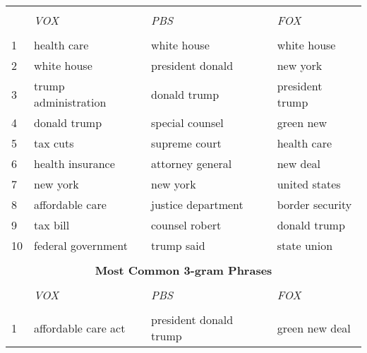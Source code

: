 \begin{table}[H]
\begin{tabular}{l||l|l|l}
        &                             &                            &                             \\
        & \textit{VOX}                & \textit{PBS}               & \textit{FOX}                \\ \hline 
        &                             &                            &                             \\
    1   & health care                 & white house                & white house                 \\
    2   & white house                 & president donald           & new york                    \\
    3   & trump administration        & donald trump               & president trump             \\
    4   & donald trump                & special counsel            & green new                   \\
    5   & tax cuts                    & supreme court              & health care                 \\
    6   & health insurance            & attorney general           & new deal                    \\
    7   & new york                    & new york                   & united states               \\
    8   & affordable care             & justice department         & border security             \\
    9   & tax bill                    & counsel robert             & donald trump                \\
    10  & federal government          & trump said                 & state union                 \\ \hline \hline %
    \multicolumn{4}{c}{}                                                                       \\ 
    \multicolumn{4}{c}{\textbf{Most Common 3-gram Phrases}}                                    \\ \hline
        &                             &                            &                             \\
        & \textit{VOX}                & \textit{PBS}               & \textit{FOX}                \\ \hline 
        &                             &                            &                             \\
    1   & affordable care act         & president donald trump     & green new deal              \\ 

\end{tabular}
\end{table}
